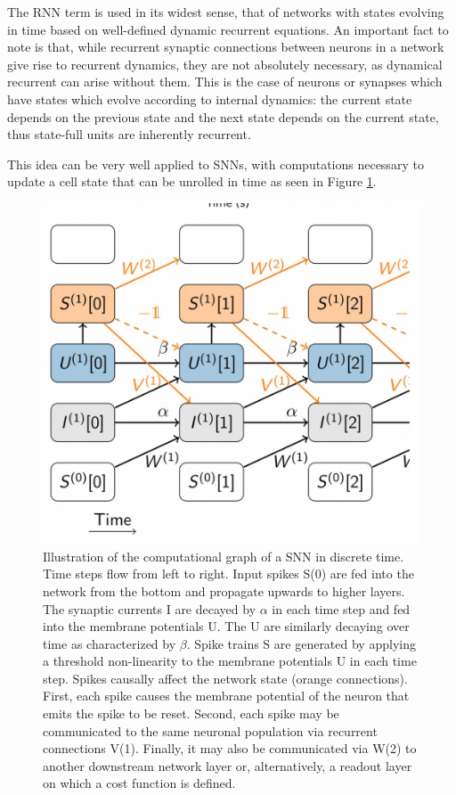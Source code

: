 \documentclass[main]{subfiles}
\begin{document}
The RNN term is used in its widest sense, that of networks with states evolving in time based on well-defined dynamic recurrent equations. An important fact to note is that, while recurrent synaptic connections between neurons in a network give rise to recurrent dynamics, they are not absolutely necessary, as dynamical recurrent can arise without them. This is the case of neurons or synapses which have states which evolve according to internal dynamics: the current state depends on the previous state and the next state depends on the current state, thus state-full units are inherently recurrent.

This idea can be very well applied to SNNs, with computations necessary to update a cell state that can be unrolled in time as seen in Figure \ref{fig:snn_unroll}.

%
\begin{figure}[H]
    \centering
    \includegraphics[width=0.6\linewidth]{10_DeepLearningWithSpikes/figures/snns_unroll.PNG}
    \caption{Illustration of the computational graph of a SNN in discrete time. Time steps flow from left to right. Input spikes S(0) are fed into the network from the bottom and propagate upwards to higher layers. The synaptic currents I are decayed by $\alpha$ in each time step and fed into the membrane potentials U. The U are similarly decaying over time as characterized by $\beta$. Spike trains S are generated by applying a threshold non-linearity to the membrane potentials U in each time step. Spikes causally affect the network state (orange connections). First, each spike causes the membrane potential of the neuron that emits the spike to be reset. Second, each spike may be communicated to the same neuronal population via recurrent connections V(1). Finally, it may also be communicated via W(2) to another downstream network layer or, alternatively, a readout layer on which a cost function is defined.}
    \label{fig:snn_unroll}
\end{figure}
%
\end{document}
